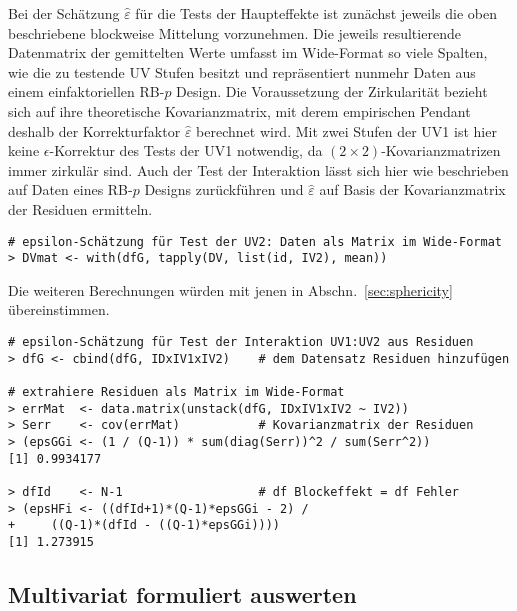 Bei der Schätzung $\hat{\varepsilon}$ für die Tests der Haupteffekte ist zunächst jeweils die oben beschriebene blockweise Mittelung vorzunehmen. Die jeweils resultierende Datenmatrix der gemittelten Werte umfasst im Wide-Format so viele Spalten, wie die zu testende UV Stufen besitzt und repräsentiert nunmehr Daten aus einem einfaktoriellen RB-$p$ Design. Die Voraussetzung der Zirkularität bezieht sich auf ihre theoretische Kovarianzmatrix, mit derem empirischen Pendant deshalb der Korrekturfaktor $\hat{\varepsilon}$ berechnet wird. Mit zwei Stufen der UV1 ist hier keine $\epsilon$-Korrektur des Tests der UV1 notwendig, da $(2 \times 2)$-Kovarianzmatrizen immer zirkulär sind. Auch der Test der Interaktion lässt sich hier wie beschrieben auf Daten eines RB-$p$ Designs zurückführen und $\hat{\varepsilon}$ auf Basis der Kovarianzmatrix der Residuen ermitteln.
\begin{lstlisting}
# epsilon-Schätzung für Test der UV2: Daten als Matrix im Wide-Format
> DVmat <- with(dfG, tapply(DV, list(id, IV2), mean))
\end{lstlisting}

Die weiteren Berechnungen würden mit jenen in Abschn.\ \ref{sec:sphericity} übereinstimmen.

\begin{lstlisting}
# epsilon-Schätzung für Test der Interaktion UV1:UV2 aus Residuen
> dfG <- cbind(dfG, IDxIV1xIV2)    # dem Datensatz Residuen hinzufügen

# extrahiere Residuen als Matrix im Wide-Format
> errMat  <- data.matrix(unstack(dfG, IDxIV1xIV2 ~ IV2))
> Serr    <- cov(errMat)           # Kovarianzmatrix der Residuen
> (epsGGi <- (1 / (Q-1)) * sum(diag(Serr))^2 / sum(Serr^2))
[1] 0.9934177

> dfId    <- N-1                   # df Blockeffekt = df Fehler
> (epsHFi <- ((dfId+1)*(Q-1)*epsGGi - 2) /
+     ((Q-1)*(dfId - ((Q-1)*epsGGi))))
[1] 1.273915
\end{lstlisting}

\subsection{Multivariat formuliert auswerten}


